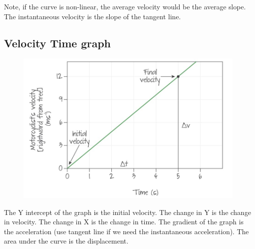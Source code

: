 \documentclass[../notes.tex]{subfiles}
\begin{document}
Note, if the curve is non-linear, the average velocity would be the average slope.
The instantaneous velocity is the slope of the tangent line.

\subsection{Velocity Time graph}
\begin{figure}[h]
\begin{center}
	\includegraphics[width=\textwidth]{./figures/velocity-time.jpg}
\end{center}
\end{figure}

The Y intercept of the graph is the initial velocity.
The change in Y is the change in velocity.
The change in X is the change in time.
The gradient of the graph is the acceleration (use tangent line if we need the instantaneous acceleration).
The area under the curve is the displacement.
\end{document}
